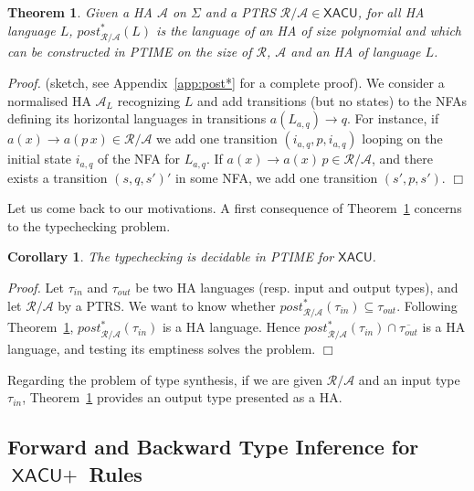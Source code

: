 \documentclass[a4paper]{article}
\theoremstyle{plain}
\newtheorem{theorem}{Theorem}
\newtheorem{corollary}{Corollary}{\bfseries}{\itshape}
\newcommand{\qed}{\hfill $\Box$}
\newenvironment{proof}{\noindent\emph{Proof.}}{}
\newcommand{\R}{\mathcal{R}}
\newcommand{\A}{\mathcal{A}}
\newcommand{\ptrs}[2]{{#1}{/}{#2}}
\newcommand{\post}{\mathit{post}}
\newcommand{\XACU}{\textsf{XACU}}
\begin{document}
\begin{theorem} \label{th:post}
Given a HA $\A$ on $\Sigma$ and a PTRS $\ptrs{\R}{\A} \in \XACU$,
for all HA language $L$, $\post_{\ptrs{\R}{\A}}^*(L)$ 
is the language of an HA of size polynomial 
and which can be constructed in PTIME on 
the size of $\R$, $\A$ and an HA of language $L$. 
\end{theorem}
\begin{proof}
(sketch, see Appendix~\ref{app:post*} for a complete proof).
We consider a normalised HA $\A_L$ recognizing $L$ and add transitions (but no states) 
to the NFAs defining its horizontal languages in transitions $a(L_{a, q}) \to q$.
For instance, if $a(x) \to a(p\, x) \in \ptrs{\R}{\A}$ 
we add one transition $(i_{a,q}, p, i_{a,q})$ looping on the initial state
$i_{a,q}$ of the NFA for $L_{a, q}$.
If $a(x) \to a(x)\, p \in \ptrs{\R}{\A}$, 
and there exists a transition $(s, q, s')'$ in some NFA,
we add one transition $(s', p, s')$.
\qed
\end{proof}


Let us come back to our motivations.
A first consequence of Theorem~\ref{th:post}
concerns to the typechecking problem.
\begin{corollary} \label{cor:post*}
The typechecking is decidable in PTIME for $\XACU$.
\end{corollary}
\begin{proof}
Let $\tau_{\mathit{in}}$ and $\tau_{\mathit{out}}$
be two HA languages (resp. input and output types),
and let $\ptrs{\R}{\A}$ by a PTRS.
We want to know
whether $\post^*_{\ptrs{\R}{\A}}(\tau_{\mathit{in}}) \subseteq \tau_{\mathit{out}}$.
Following Theorem~\ref{th:post},
$\post^*_{\ptrs{\R}{\A}}(\tau_{\mathit{in}})$ is a HA language.
Hence 
$\post^*_{\ptrs{\R}{\A}}(\tau_{\mathit{in}}) \cap \overline{\tau_{\mathit{out}}}$
is a HA language, and testing its emptiness solves the problem.
\qed
\end{proof}


Regarding the problem of type synthesis, 
if we are given $\ptrs{\R}{\A}$ and 
an input type $\tau_{\mathit{in}}$, 
Theorem~\ref{th:post}
provides an output type presented as a HA.





\subsection{Forward and Backward Type Inference for $\XACU+$ Rules} \label{sec:post*XACU+}
\end{document}
